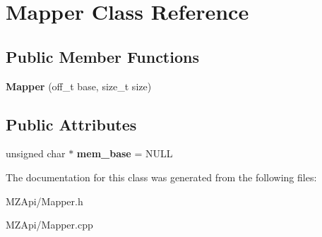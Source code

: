 \hypertarget{classMapper}{}\section{Mapper Class Reference}
\label{classMapper}
\subsection*{Public Member Functions}
\begin{DoxyCompactItemize}
\item 
{\bfseries Mapper} (off\+\_\+t base, size\+\_\+t size)\hypertarget{classMapper_ad94bc5276f51985b51f72922f64bc19e}{}\label{classMapper_ad94bc5276f51985b51f72922f64bc19e}

\end{DoxyCompactItemize}
\subsection*{Public Attributes}
\begin{DoxyCompactItemize}
\item 
unsigned char $\ast$ {\bfseries mem\+\_\+base} = N\+U\+LL\hypertarget{classMapper_afadadee19eb92436827f4f1e8c71a4e6}{}\label{classMapper_afadadee19eb92436827f4f1e8c71a4e6}

\end{DoxyCompactItemize}


The documentation for this class was generated from the following files\+:\begin{DoxyCompactItemize}
\item 
M\+Z\+Api/Mapper.\+h\item 
M\+Z\+Api/Mapper.\+cpp\end{DoxyCompactItemize}

